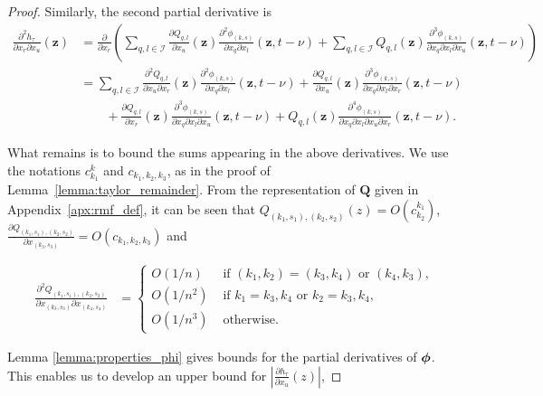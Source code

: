 \documentclass[acmsmall]{acmart}
\newcommand\bz{\mathbf{z}}
\newcommand\bphi{\text{\boldmath$\phi$}}
\newcommand\bQ{\mathbf{Q}}
\newcommand\calI{\mathcal{I}}
\newcommand{\dddd}[5]{ \frac{\partial^4 #1 }{ \partial x_{#2} \partial x_{#3} \partial x_{#4} \partial x_{#5} }}
\newcommand{\ddd}[4]{ \frac{\partial^3 #1 }{ \partial x_{#2} \partial x_{#3} \partial x_{#4} }}
\newcommand{\dd}[3]{ \frac{\partial^2 #1 }{ \partial x_{#2} \partial x_{#3}}}
\begin{document}
\begin{proof}
Similarly, the second partial derivative is
\begin{align*}
\frac{\partial^2 h_\tau}{\partial x_r \partial x_u}(\bz) &= \frac{\partial }{\partial x_r} \left( \sum_{q,l \in \calI} \frac{\partial Q_{q,l}}{\partial x_u}(\bz) \frac{\partial^2 \phi_{(k,s)}}{\partial x_q \partial x_l}(\bz,t-\nu) + \sum_{q,l \in \calI} Q_{q,l}(\bz) \frac{\partial^3 \phi_{(k,s)}}{\partial x_q \partial x_l \partial x_u}(\bz,t-\nu) \right) \\
& = \sum_{q,l\in \calI} \frac{\partial^2 Q_{q,l}}{\partial x_u \partial x_r}(\bz) \dd{\phi_{(k,s)}}{q}{l}(\bz, t-\nu) + \frac{\partial Q_{q,l}}{\partial x_u}(\bz) \ddd{\phi_{(k,s)}}{q}{l}{r}(\bz, t - \nu) \\
& \qquad + \frac{\partial Q_{q,l}}{\partial x_r}(\bz) \ddd{\phi_{(k,s)}}{q}{l}{u}(\bz, t-\nu) + Q_{q,l}(\bz) \dddd{\phi_{(k,s)}}{q}{l}{u}{r}(\bz, t-\nu).
\end{align*}

What remains is to bound the sums appearing in the above derivatives. We use the notations $c^k_{k_1}$ and $c_{k_1,k_2,k_3}$, as in the proof of Lemma~\ref{lemma:taylor_remainder}. From the representation of $\bQ$ given in Appendix~\ref{apx:rmf_def}, it can be seen that $Q_{(k_1,s_1),(k_2,s_2)}(z) = O(c^{k_1}_{k_2})$, $\frac{\partial Q_{(k_1,s_1),(k_2,s_2)}}{\partial x_{(k_3,s_3)}} = O(c_{k_1,k_2,k_3})$ and 


\begin{align*}
\dd{Q_{(k_1,s_1),(k_2,s_2)}}{(k_3,s_3)}{(k_4,s_4)} & = \begin{cases}
O(1/n) & \text{ if } (k_1, k_2) = (k_3,k_4) \text{ or } (k_4,k_3), \\
O(1/n^2) & \text{ if } k_1 = k_3, k_4 \text{ or } k_2 = k_3,  k_4, \\
O(1/n^3) & \text{ otherwise. }
\end{cases}
\end{align*}


Lemma \ref{lemma:properties_phi} gives bounds for the partial derivatives of $\bphi$. This enables us to develop an upper bound for $|\frac{\partial h_\tau}{\partial x_u}(z)|$,


\end{proof}
\end{document}
